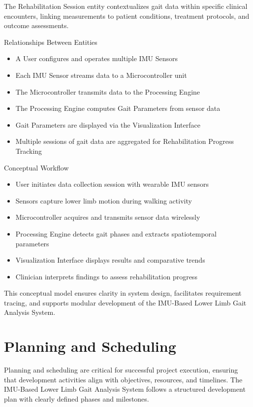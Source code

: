 \documentclass[12pt,a4paper]{report}
\begin{document}
The Rehabilitation Session entity contextualizes gait data within specific clinical encounters, linking measurements to patient conditions, treatment protocols, and outcome assessments.

Relationships Between Entities
\begin{itemize}
\item A User configures and operates multiple IMU Sensors

\item Each IMU Sensor streams data to a Microcontroller unit

\item The Microcontroller transmits data to the Processing Engine

\item The Processing Engine computes Gait Parameters from sensor data

\item Gait Parameters are displayed via the Visualization Interface

\item Multiple sessions of gait data are aggregated for Rehabilitation Progress Tracking
\end{itemize}
Conceptual Workflow
\begin{itemize}
\item User initiates data collection session with wearable IMU sensors

\item Sensors capture lower limb motion during walking activity

\item Microcontroller acquires and transmits sensor data wirelessly

\item Processing Engine detects gait phases and extracts spatiotemporal parameters

\item Visualization Interface displays results and comparative trends

\item Clinician interprets findings to assess rehabilitation progress
\end{itemize}
This conceptual model ensures clarity in system design, facilitates requirement tracing, and supports modular development of the IMU-Based Lower Limb Gait Analysis System.

\section{Planning and Scheduling}
Planning and scheduling are critical for successful project execution, ensuring that development activities align with objectives, resources, and timelines. The IMU-Based Lower Limb Gait Analysis System follows a structured development plan with clearly defined phases and milestones.
\end{document}

